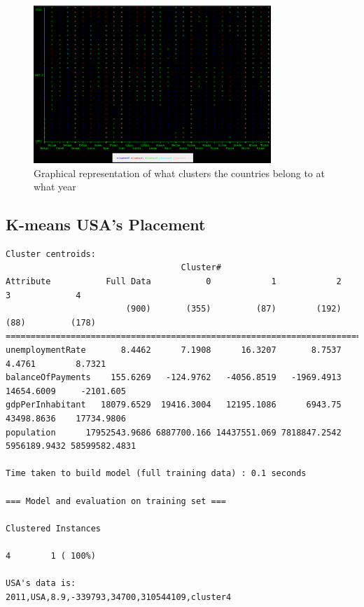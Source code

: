 \begin{figure}[h!]
  \centering
\includegraphics[angle=90,width=0.8\textwidth]{Appendix/Images/kMeans}
\caption{Graphical representation of what clusters the countries belong to at what year}
\label{fig:largeClusters}
\end{figure}

\subsection{K-means USA's Placement}
\label{A_kmr_usa}
\begin{lstlisting}[basicstyle=\footnotesize\ttfamily,numbers=none]
Cluster centroids:
                                   Cluster#
Attribute           Full Data           0            1            2            3             4
                        (900)       (355)         (87)        (192)         (88)         (178)
=================================================================================================
unemploymentRate       8.4462      7.1908      16.3207       8.7537       4.4761        8.7321
balanceOfPayments    155.6269   -124.9762   -4056.8519   -1969.4913   14654.6009     -2101.605
gdpPerInhabitant   18079.6529  19416.3004   12195.1086      6943.75   43498.8636    17734.9806
population      17952543.9686 6887700.166 14437551.069 7818847.2542 5956189.9432 58599582.4831

Time taken to build model (full training data) : 0.1 seconds

=== Model and evaluation on training set ===

Clustered Instances

4        1 ( 100%)

USA's data is:
2011,USA,8.9,-339793,34700,310544109,cluster4
\end{lstlisting}

\pagebreak